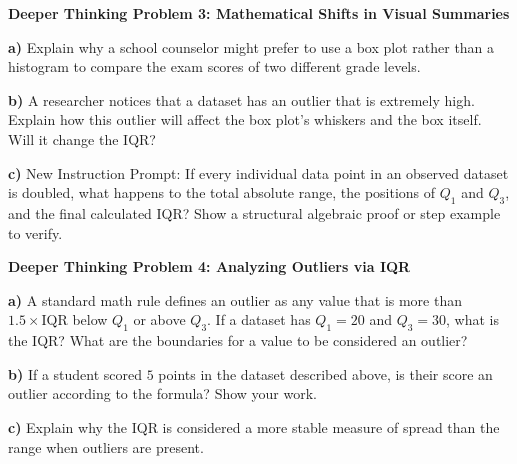\documentclass[12pt, letterpaper, fleqn]{article}
\begin{document}
\newpage

\begin{tcolorbox}[colback=white, colframe=black, boxrule=1pt, arc=4mm, left=6mm, right=6mm, top=5mm, bottom=5mm]
\textbf{Deeper Thinking Problem 3: Mathematical Shifts in Visual Summaries}

\medskip

\noindent
\textbf{a)} Explain why a school counselor might prefer to use a box plot rather than a histogram to compare the exam scores of two different grade levels.

\vspace{5cm}

\noindent
\textbf{b)} A researcher notices that a dataset has an outlier that is extremely high. Explain how this outlier will affect the box plot's whiskers and the box itself. Will it change the IQR?

\vspace{5cm}

\noindent
\textbf{c)} New Instruction Prompt: If every individual data point in an observed dataset is doubled, what happens to the total absolute range, the positions of $Q_1$ and $Q_3$, and the final calculated IQR? Show a structural algebraic proof or step example to verify.

\vspace{5cm}
\end{tcolorbox}

\vspace{3mm}

\begin{tcolorbox}[colback=white, colframe=black, boxrule=1pt, arc=4mm, left=6mm, right=6mm, top=5mm, bottom=5mm]
\textbf{Deeper Thinking Problem 4: Analyzing Outliers via IQR}

\medskip

\noindent
\textbf{a)} A standard math rule defines an outlier as any value that is more than $1.5 \times \text{IQR}$ below $Q_1$ or above $Q_3$. If a dataset has $Q_1 = 20$ and $Q_3 = 30$, what is the IQR? What are the boundaries for a value to be considered an outlier?

\vspace{5cm}

\noindent
\textbf{b)} If a student scored $5$ points in the dataset described above, is their score an outlier according to the formula? Show your work.

\vspace{5cm}

\noindent
\textbf{c)} Explain why the IQR is considered a more stable measure of spread than the range when outliers are present.

\vspace{5cm}
\end{tcolorbox}
\end{document}
